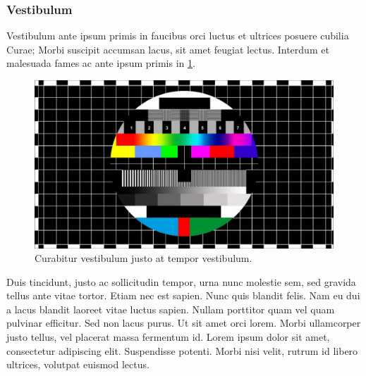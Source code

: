 \subsubsection{Vestibulum}\label{subsubsec:Vestibulum}
Vestibulum ante ipsum primis in faucibus orci luctus et ultrices posuere cubilia Curae; Morbi suscipit accumsan lacus, sit amet feugiat lectus. Interdum et malesuada fames ac ante ipsum primis in \ref{fig:TestImage}. 

\begin{figure}[htbp]
\centering
\includegraphics[scale=0.3]{Abbildungen/TestImage.jpg}
\caption{Curabitur vestibulum justo at tempor vestibulum.}
\label{fig:TestImage}
\end{figure}

Duis tincidunt, justo ac sollicitudin tempor, urna nunc molestie sem, sed gravida tellus ante vitae tortor. Etiam nec est sapien. Nunc quis blandit felis. Nam eu dui a lacus blandit laoreet vitae luctus sapien. Nullam porttitor quam vel quam pulvinar efficitur. Sed non lacus purus. Ut sit amet orci lorem. Morbi ullamcorper justo tellus, vel placerat massa fermentum id. Lorem ipsum dolor sit amet, consectetur adipiscing elit. Suspendisse potenti. Morbi nisi velit, rutrum id libero ultrices, volutpat euismod lectus.\cite[S. 1030]{Morbiac.20.02.1500}